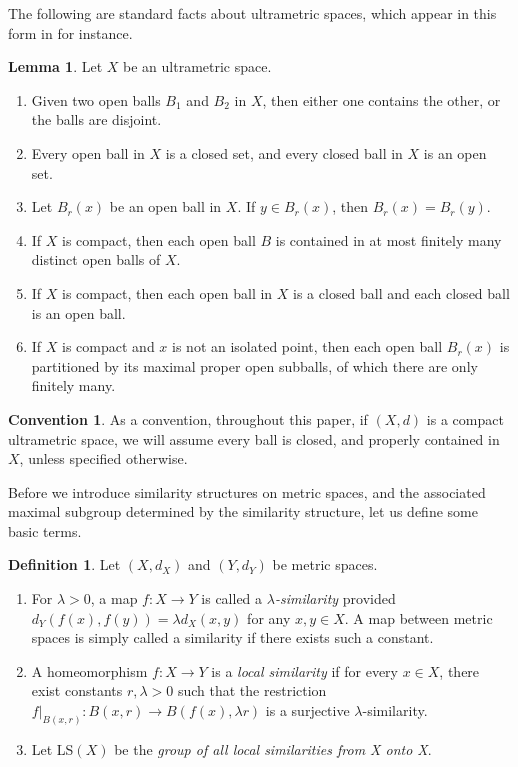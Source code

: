 \documentclass[12pt]{amsart}
\numberwithin{equation}{subsection}
\theoremstyle{definition}
\newtheorem{lemma}[theorem]{Lemma}
\theoremstyle{definition}
\newtheorem{definition}[theorem]{Definition}
\newtheorem*{convention}{Convention}
\theoremstyle{remark}
\begin{document}
The following are standard facts about ultrametric spaces, which appear in this form in \cite[Lemma 3.2]{FarleyHughes15} for instance. 

\begin{lemma}
Let $X$ be an ultrametric space.
    \begin{enumerate}
        \item Given two open balls $B_1$ and $B_2$ in $X$, then either one contains the other, or the balls are disjoint. 
        \item Every open ball in $X$ is a closed set, and every closed ball in $X$ is an open set. 
        \item Let $B_r(x)$ be an open ball in $X$. If $y \in B_r(x)$, then $B_r(x) = B_r(y)$.
        \item If $X$ is compact, then each open ball $B$ is contained in at most finitely many distinct open balls of $X$. 
        \item If $X$ is compact, then each open ball in $X$ is a closed ball and each closed ball is an open ball.
        \item If $X$ is compact and $x$ is not an isolated point, then each open ball $B_r(x)$ is partitioned by its maximal proper open subballs, of which there are only finitely many. 
    \end{enumerate}
\end{lemma}




\begin{convention} As a convention, throughout this paper, if $(X,d)$ is a compact ultrametric space, we will assume every ball is closed, and properly contained in $X$, unless specified otherwise. 
\end{convention}

Before we introduce similarity structures on metric spaces, and the associated maximal subgroup determined by the similarity structure, let us define some basic terms.

\begin{definition}
Let $(X,d_{X})$ and $(Y,d_{Y})$ be metric spaces.
\begin{enumerate}
\item For $\lambda > 0$, a map $f : X \to Y$ is called a \textit{$\lambda$-similarity} provided $d_{Y}(f(x),f(y)) = \lambda d_{X}(x,y)$ for any $x,y \in X$. A map between metric spaces is simply called a similarity if there exists such a constant. 
\item A homeomorphism $f : X \to Y$ is a \textit{local similarity} if for every $x \in X$, there exist constants $r, \lambda > 0$ such that the restriction $f\vert_{B(x,r)} : B(x,r) \to B(f(x), \lambda r)$ is a surjective $\lambda$-similarity.
\item Let LS$(X)$ be the \textit{group of all local similarities from X onto X}. 
\end{enumerate}
\end{definition}
\end{document}
